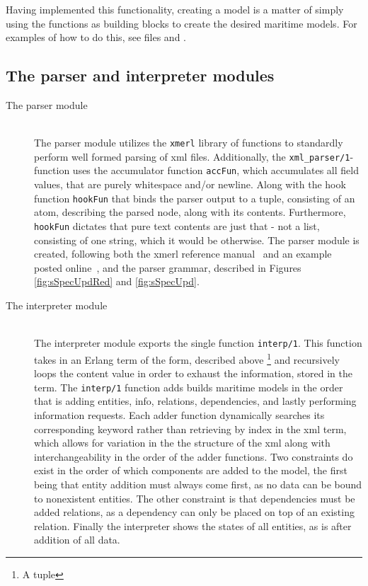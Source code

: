 Having implemented this functionality, creating a model is a matter of simply using the functions as building blocks to create the desired maritime models. For examples of how to do this, see files  and .

\subsection{The parser and interpreter modules}

\begin{description}
	\item[The parser module]\ \\
		The parser module utilizes the \lstinline{xmerl} library of functions to standardly perform well formed parsing of xml files. Additionally, the \lstinline{xml_parser/1}-function uses the accumulator function \lstinline{accFun}, which accumulates all field values, that are  purely whitespace and/or newline. Along with the hook function \lstinline{hookFun} that binds the parser output to a tuple, consisting of an atom, describing the parsed node, along with its contents. Furthermore, \lstinline{hookFun} dictates that pure text contents are just that - not a list, consisting of one string, which it would be otherwise. The parser module is created, following both the xmerl reference manual~\cite{xmerl} and an example posted online~\cite{xmerlEx}, and the parser grammar, described in Figures \ref{fig:sSpecUpdRed} and \ref{fig:sSpecUpd}.
	\item[The interpreter module]\ \\
		The interpreter module exports the single function \lstinline{interp/1}. This function takes in an Erlang term of the form, described above \footnote{A tuple} and recursively loops the content value in order to exhaust the information, stored in the term. The \lstinline{interp/1} function adds builds maritime models in the order that is adding entities, info, relations, dependencies, and lastly performing information requests. Each adder function dynamically searches its corresponding keyword rather than retrieving by index in the xml term, which allows for variation in the the structure of the xml along with interchangeability in the order of the adder functions. Two constraints do exist in the order of which components are added to the model, the first being that entity addition must always come first, as no data can be bound to nonexistent entities. The other constraint is that dependencies must be added  relations, as a dependency can only be placed on top of an existing relation. Finally the interpreter shows the states of all entities, as is after addition of all data.
\end{description}
